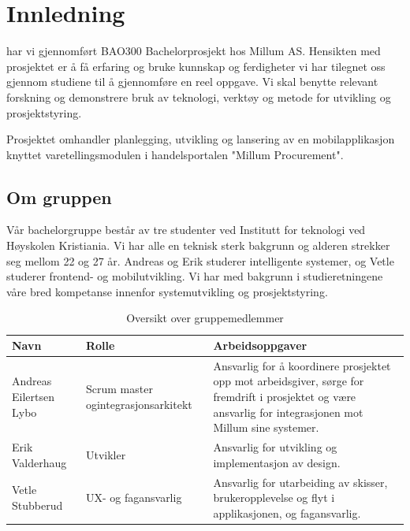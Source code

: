\chapter{\color{Millum}Innledning}
 har vi gjennomført BAO300 Bachelorprosjekt hos Millum AS. Hensikten med prosjektet er å få erfaring og bruke kunnskap og ferdigheter vi har tilegnet oss gjennom studiene til å gjennomføre en reel oppgave. Vi skal benytte relevant forskning og demonstrere bruk av teknologi, verktøy og metode for utvikling og prosjektstyring.

Prosjektet omhandler planlegging, utvikling og lansering av en mobilapplikasjon knyttet varetellingsmodulen i handelsportalen "Millum Procurement".

\section{\textbf{Om gruppen}}
Vår bachelorgruppe består av tre studenter ved Institutt for teknologi ved Høyskolen Kristiania. Vi har alle en teknisk sterk bakgrunn og alderen strekker seg mellom 22 og 27 år. Andreas og Erik studerer intelligente systemer, og Vetle studerer frontend- og mobilutvikling. Vi har med bakgrunn i studieretningene våre bred kompetanse innenfor systemutvikling og prosjektstyring.

\begin{table}[htbp]
  \centering
  \caption{Oversikt over gruppemedlemmer}
    \begin{tabular}{|l|l|p{17.355em}|}
    \toprule
    Navn & Rolle & Arbeidsoppgaver \\
    \midrule
    \multicolumn{1}{|p{6.43em}|}{Andreas Eilertsen \newline{}Lybo} & \multicolumn{1}{p{7.215em}|}{Scrum master og\newline{}integrasjonsarkitekt} & Ansvarlig for å koordinere prosjektet opp mot arbeidsgiver, sørge for fremdrift i prosjektet og være ansvarlig for integrasjonen\newline{} mot Millum sine systemer. \\
    \midrule
    Erik Valderhaug & Utvikler & Ansvarlig for utvikling og \newline{}implementasjon av design. \\
    \midrule
    Vetle Stubberud & UX- og fagansvarlig & Ansvarlig for utarbeiding av skisser, \newline{}brukeropplevelse og flyt i applikasjonen, og \newline{}fagansvarlig. \\
    \bottomrule
    \end{tabular}%
  \label{tab:addlabel}%
\end{table}%

